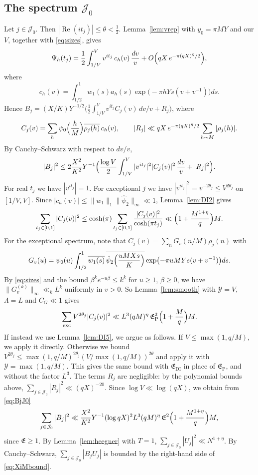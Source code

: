 \documentclass[11pt]{amsart}
\theoremstyle{remark}
\theoremstyle{definition}
\numberwithin{equation}{section}
\newcommand{\Jc}{\mathcal{J}}
\newcommand{\exc}{\mathrm{exc}}
\begin{document}
\subsection{The spectrum \texorpdfstring{$\Jc_0$}{J\_0}}\label{sec:J0}
Let $j\in\Jc_0$. Then $|\operatorname{Re}(it_j)|\le\theta<\frac12$. Lemma~\ref{lem:vrep} with $y_0=\pi MY$ and our $V$, together with \eqref{eq:sizes}, gives
\[
\Psi_h(t_j)=\frac12\int_{1/V}^Vv^{it_j}\,c_h(v)\,\frac{dv}v+O\Bigl(qX\,e^{-\pi(qX)^\eta/2}\Bigr),
\]
where
\[
c_h(v)=\int_{1/2}^1w_1(s)a_h(s)\exp\bigl(-\pi hYs(v+v^{-1})\bigr)ds.
\]
Hence $B_j=(X/K)Y^{-1/2}\bigl(\frac12\int_{1/V}^Vv^{it_j}C_j(v)\,dv/v+R_j\bigr)$, where
\[
C_j(v)=\sum_{h}\psi_0\Bigl(\frac hM\Bigr)\overline{\rho_j(h)}\,c_h(v),\qquad|R_j|\ll qX\,e^{-\pi(qX)^\eta/2}\sum_{h\sim M}|\rho_j(h)|.
\]
By Cauchy--Schwarz with respect to $dv/v$,
\begin{equation}\label{eq:BjJ0}
|B_j|^2\le2\frac{X^2}{K^2}Y^{-1}\Bigl(\frac{\log V}2\int_{1/V}^V|v^{it_j}|^2|C_j(v)|^2\,\frac{dv}v+|R_j|^2\Bigr).
\end{equation}
For real $t_j$ we have $|v^{it_j}|=1$. For exceptional $j$ we have $|v^{it_j}|^2=v^{-2\theta_j}\le V^{2\theta_j}$ on $[1/V,V]$. Since $|c_h(v)|\le\|w_1\|_1\|\hat\psi_2\|_\infty\ll1$, Lemma~\ref{lem:DI2} gives
\[
\sum_{t_j\in[0,1]}|C_j(v)|^2\le\cosh(\pi)\sum_{t_j\in[0,1]}\frac{|C_j(v)|^2}{\cosh(\pi t_j)}\ll\Bigl(1+\frac{M^{1+\eta}}q\Bigr)M.
\]
For the exceptional spectrum, note that $C_j(v)=\overline{\sum_nG_v(n/M)\rho_j(n)}$ with
\[
G_v(u)=\psi_0(u)\int_{1/2}^1\overline{w_1(s)}\,\overline{\hat\psi_2\Bigl(\frac{uMXs}K\Bigr)}\exp\bigl(-\pi uMYs(v+v^{-1})\bigr)ds.
\]
By \eqref{eq:sizes} and the bound $\beta^ke^{-u\beta}\le k^k$ for $u\ge1$, $\beta\ge0$, we have $\|G_v^{(k)}\|_\infty\ll_kL^k$ uniformly in $v>0$. So Lemma~\ref{lem:smooth} with $\mathcal Y=V$, $\Lambda=L$ and $C_G\ll1$ gives
\[
\sum_{\exc}V^{2\theta_j}|C_j(v)|^2\ll L^{3}(qM)^\eta\,\mathfrak E_{\mathrm P}^2\Bigl(1+\frac Mq\Bigr)M.
\]
If instead we use Lemma~\ref{lem:DI5}, we argue as follows. If $V\le\max(1,q/M)$, we apply it directly. Otherwise we bound $V^{2\theta_j}\le\max(1,q/M)^{2\theta_j}(V/\max(1,q/M))^{2\theta}$ and apply it with $\mathcal Y=\max(1,q/M)$. This gives the same bound with $\mathfrak E_{\mathrm{DI}}$ in place of $\mathfrak E_{\mathrm P}$, and without the factor $L^3$. The terms $R_j$ are negligible: by the polynomial bounds above, $\sum_{j\in\Jc_0}|R_j|^2\ll(qX)^{-20}$. Since $\log V\ll\log(qX)$, we obtain from \eqref{eq:BjJ0}
\[
\sum_{j\in\Jc_0}|B_j|^2\ll\frac{X^2}{K^2}Y^{-1}(\log qX)^2L^3(qM)^{\eta}\,\mathfrak E^2\Bigl(1+\frac{M^{1+\eta}}q\Bigr)M,
\]
since $\mathfrak E\ge1$. By Lemma~\ref{lem:heegner} with $T=1$, $\sum_{j\in\Jc_0}|U_j|^2\ll N^{1+\eta}$. By Cauchy--Schwarz, $\sum_{j\in\Jc_0}|B_jU_j|$ is bounded by the right-hand side of \eqref{eq:XiMbound}.
\end{document}
